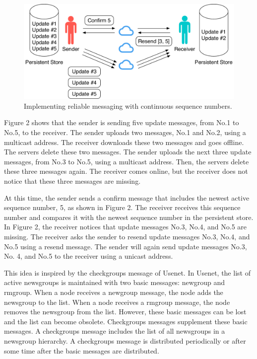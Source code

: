 \documentclass{sig-alternate-05-2015}
\begin{document}
\begin{figure}[t]
	\centering
	\includegraphics[scale=0.36]{reliable_sync}
	\caption{Implementing reliable messaging with continuous sequence numbers.}
\end{figure}

Figure 2 shows that the sender is sending five update messages, from No.1 to No.5, to the receiver.
The sender uploads two messages, No.1 and No.2, using a multicast address.
The receiver downloads these two messages and goes offline.
The servers delete these two messages.
The sender uploads the next three update messages, from No.3 to No.5, using a multicast address.
Then, the servers delete these three messages again.
The receiver comes online, but the receiver does not notice that these three messages are missing.

At this time, the sender sends a confirm message that includes the newest active sequence number, 5, as shown in Figure 2.
The receiver receives this sequence number and compares it with the newest sequence number in the persistent store.
In Figure 2, the receiver notices that update messages No.3, No.4, and No.5 are missing.
The receiver asks the sender to resend update messages No.3, No.4, and No.5 using a resend message.
The sender will again send update messages No.3, No. 4, and No.5 to the receiver using a unicast address.

This idea is inspired by the checkgroups message of Usenet\cite{usenet}.
In Usenet, the list of active newsgroups is maintained with two basic messages: newgroup and rmgroup.
When a node receives a newgroup message, the node adds the newsgroup to the list.
When a node receives a rmgroup message, the node removes the newsgroup from the list.
However, these basic messages can be lost and the list can become obsolete.
Checkgroups messages supplement these basic messages.
A checkgroups message includes the list of all newsgroups in a newsgroup hierarchy.
A checkgroups message is distributed periodically or after some time after the basic messages are distributed.
\end{document}
